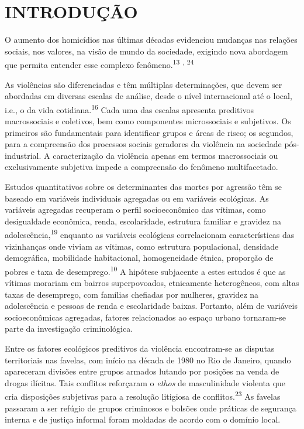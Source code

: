 \documentclass{article}
\begin{document}
\section{INTRODUÇÃO}

O aumento dos homicídios nas últimas décadas evidenciou mudanças nas relações
sociais, nos valores, na visão de mundo da sociedade, exigindo nova abordagem
que permita entender esse complexo fenômeno.\textsuperscript{13}
\textsuperscript{,}
\textsuperscript{24}

As violências são diferenciadas e têm múltiplas determinações, que devem ser
abordadas em diversas escalas de análise, desde o nível internacional até o
local, i.e., o da vida cotidiana.\textsuperscript{16}
Cada uma das escalas apresenta preditivos macrossociais e coletivos, bem como
componentes microssociais e subjetivos. Os primeiros são fundamentais para
identificar grupos e áreas de risco; os segundos, para a compreensão dos
processos sociais geradores da violência na sociedade pós-industrial. A
caracterização da violência apenas em termos macrossociais ou exclusivamente
subjetiva impede a compreensão do fenômeno multifacetado.

Estudos quantitativos sobre os determinantes das mortes por agressão têm se
baseado em variáveis individuais agregadas ou em variáveis ecológicas. As
variáveis agregadas recuperam o perfil socioeconômico das vítimas, como
desigualdade econômica, renda, escolaridade, estrutura familiar e gravidez na
adolescência,\textsuperscript{19}
enquanto as variáveis ecológicas correlacionam características das vizinhanças
onde viviam as vítimas, como estrutura populacional, densidade demográfica,
mobilidade habitacional, homogeneidade étnica, proporção de pobres e taxa de
desemprego.\textsuperscript{10}
A hipótese subjacente a estes estudos é que as vítimas morariam em bairros
superpovoados, etnicamente heterogêneos, com altas taxas de desemprego, com
famílias chefiadas por mulheres, gravidez na adolescência e pessoas de renda e
escolaridade baixas. Portanto, além de variáveis socioeconômicas agregadas,
fatores relacionados ao espaço urbano tornaram-se parte da investigação
criminológica.

Entre os fatores ecológicos preditivos da violência encontram-se as disputas
territoriais nas favelas, com início na década de 1980 no Rio de Janeiro, quando
apareceram divisões entre grupos armados lutando por posições na venda de drogas
ilícitas. Tais conflitos reforçaram o \textit{ethos}
de masculinidade violenta que cria disposições subjetivas para a resolução
litigiosa de conflitos.\textsuperscript{23}
As favelas passaram a ser refúgio de grupos criminosos e bolsões onde práticas
de segurança interna e de justiça informal foram moldadas de acordo com o
domínio local.
\end{document}
